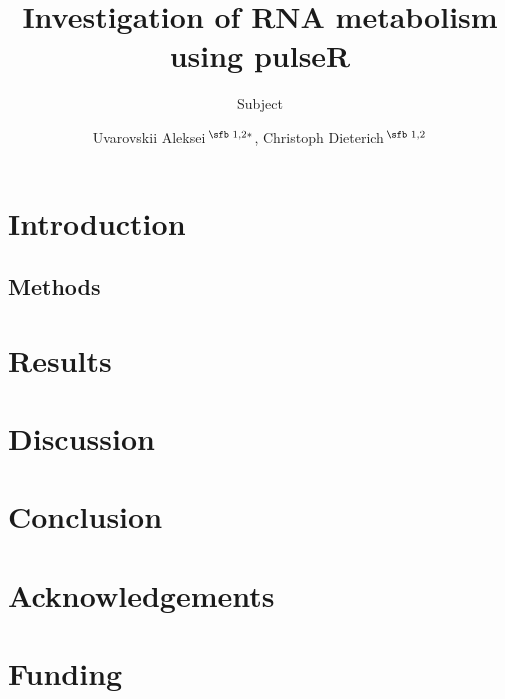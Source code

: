 \documentclass{bioinfo}
\begin{document}

\subtitle{Subject}

\title[pulseR package]{Investigation of RNA metabolism using pulseR}
\author[Uvarovskii \textit{et~al}.]{
Uvarovskii Aleksei\,$^{\text{\sfb 1,2}*}$,
Christoph Dieterich\,$^{\text{\sfb 1,2}}$ }
\address{$^{\text{\sf 1}}$
Section of Bioinformatics and Systems Cardiology
Klaus Tschira Institute for Integrative Computational Cardiology
Department of Internal Medicine III
University Hospital Heidelberg,   
Im Neuenheimer Feld 669
69120 Heidelberg,
and 
$^{\text{\sf 2}}$
German Center for Cardiovascular Research (DZHK),
Im Neuenheimer Feld 669
69120 Heidelberg
}




\maketitle

\section{Introduction}

\begin{methods}
\section{Methods}

\end{methods}

\section{Results}


\section{Discussion}
\section{Conclusion}
\section*{Acknowledgements}

\section*{Funding}

%
%
%
%
%
%

%

\end{document}
